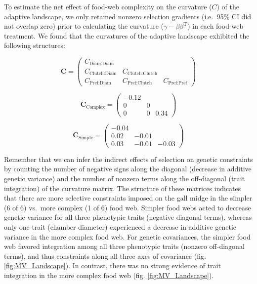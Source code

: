 \documentclass[11pt,]{article}
\begin{document}
To estimate the net effect of food-web complexity on the curvature
(\(C\)) of the adaptive landscape, we only retained nonzero selection
gradients (i.e.~95\% CI did not overlap zero) prior to calculating the
curvature (\(\gamma - \beta \beta^\text{T}\)) in each food-web
treatment. We found that the curvatures of the adaptive landscape
exhibited the following structures:

\[\textbf{C} = \begin{pmatrix} C_{\text{Diam:Diam}}&& \\ C_{\text{Clutch:Diam}} & C_{\text{Clutch:Clutch}} & \\ C_{\text{Pref:Diam}} & C_{\text{Pref:Clutch}} & C_{\text{Pref:Pref}} \end{pmatrix}\]

\[\textbf{C}_{\text{Complex}} = \begin{pmatrix} 
-0.12 &  &  \\  
0 & 0 &  \\  
0 & 0 & 0.34 \end{pmatrix}\]

\[\textbf{C}_{\text{Simple}} = \begin{pmatrix} 
-0.04 &  &  \\  
0.02 & -0.01 &  \\  
0.03 & -0.01 & -0.03 \end{pmatrix}\]

Remember that we can infer the indirect effects of selection on genetic
constraints by counting the number of negative signs along the diagonal
(decrease in additive genetic variance) and the number of nonzero terms
along the off-diagonal (trait integration) of the curvature matrix. The
structure of these matrices indicates that there are more selective
constraints imposed on the gall midge in the simpler (6 of 6) vs.~more
complex (1 of 6) food web. Simpler food webs acted to decrease genetic
variance for all three phenotypic traits (negative diagonal terms),
whereas only one trait (chamber diameter) experienced a decrease in
additive genetic variance in the more complex food web. For genetic
covariances, the simpler food web favored integration among all three
phenotypic traits (nonzero off-diagonal terms), and thus constraints
along all three axes of covariance (fig. \ref{fig:MV_Landscape}). In
contrast, there was no strong evidence of trait integration in the more
complex food web (fig. \ref{fig:MV_Landscape}).
\end{document}
